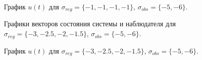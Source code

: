 \begin{figure}[!h]
	\caption{График $u(t)$ для $\sigma_{reg} = \{ -1, -1, -1, -1\}$, $\sigma_{obs}= \{-5, -6 \}$.}
	\label{3_u_k1l2}
\end{figure}


\begin{figure}[!h]
	\caption{Графики векторов состояния системы и наблюдателя для $\sigma_{reg} = \{ -3, -2.5, -2, -1.5\}$, $\sigma_{obs}= \{-5, -6 \}$.}
	\label{3_x_k2l2}
\end{figure}

\begin{figure}[!h]
	\caption{График $u(t)$ для $\sigma_{reg} = \{ -3, -2.5, -2, -1.5\}$, $\sigma_{obs}= \{-5, -6 \}$.}
	\label{3_u_k2l2}
\end{figure}


